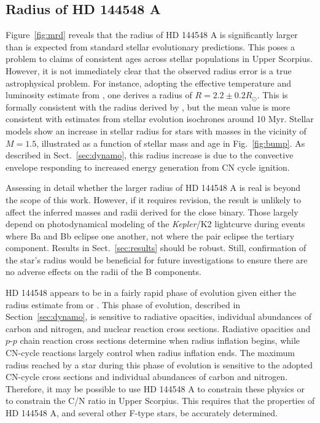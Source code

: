 \documentclass{aa}
\begin{document}
\subsection{Radius of HD 144548 A}
\label{sec:radius}
Figure~\ref{fig:mrd} reveals that the radius of HD 144548 A is significantly larger than is expected from standard stellar evolutionary predictions. This poses a problem to claims of consistent ages across stellar populations in Upper Scorpius. However, it is not immediately clear that the observed radius error is a true astrophysical problem. For instance, adopting the effective temperature and luminosity estimate from \citet{Pecaut2012}, one derives a radius of $R = 2.2 \pm 0.2 R_{\odot}$. This is formally consistent with the radius derived by \citep{Alonso2015}, but the mean value is more consistent with estimates from stellar evolution isochrones around 10 Myr. Stellar models show an increase in stellar radius for stars with masses in the vicinity of $M = 1.5$\msun, illustrated as a function of stellar mass and age in Fig.\ \ref{fig:bump}. As described in Sect.\ \ref{sec:dynamo}, this radius increase is due to the convective envelope responding to increased energy generation from CN cycle ignition.

Assessing in detail whether the larger radius of HD 144548 A is real is beyond the scope of this work. However, if it requires revision, the result is unlikely to affect the inferred masses and radii derived for the close binary. Those largely depend on photodynamical modeling of the \emph{Kepler}/K2 lightcurve during events where Ba and Bb eclipse one another, not where the pair eclipse the tertiary component. Results in Sect.~\ref{sec:results} should be robust. Still, confirmation of the star's radius would be beneficial for future investigations to ensure there are no adverse effects on the radii of the B components. 

HD 144548 appears to be in a fairly rapid phase of evolution given either the radius estimate from \cite{Pecaut2012} or \citet{Alonso2015}. This phase of evolution, described in Section~\ref{sec:dynamo}, is sensitive to radiative opacities, individual abundances of carbon and nitrogen, and nuclear reaction cross sections. Radiative opacities and $p$-$p$ chain reaction cross sections determine when radius inflation begins, while CN-cycle reactions largely control when radius inflation ends. The maximum radius reached by a star during this phase of evolution is sensitive to the adopted CN-cycle cross sections and individual abundances of carbon and nitrogen. Therefore, it may be possible to use HD 144548 A to constrain these physics or to constrain the C/N ratio in Upper Scorpius. This requires that the properties of HD 144548 A, and several other F-type stars, be accurately determined.
\end{document}
